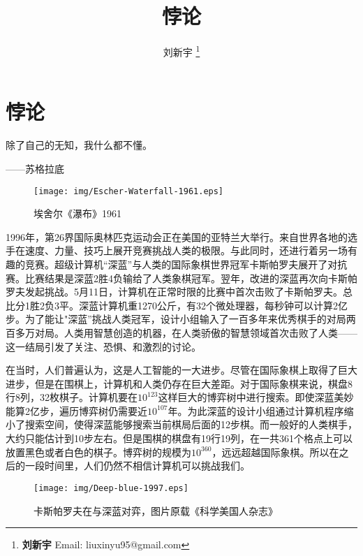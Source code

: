 \documentclass{article}
\begin{document}
\title{悖论}

\author{刘新宇
\thanks{{\bfseries 刘新宇} \newline
  Email: liuxinyu95@gmail.com \newline}
  }

\maketitle
\fi


\ifx\wholebook\relax
\chapter{悖论}
\fi

\epigraph{除了自己的无知，我什么都不懂。}{——苏格拉底}

\begin{wrapfigure}{R}{0.5\textwidth}
 \centering
 \texttt{[image: img/Escher-Waterfall-1961.eps]}
 \captionsetup{labelformat=empty}
 \caption{埃舍尔《瀑布》1961}
 \label{fig:Escher-Waterfall}
\end{wrapfigure}

1996年，第26界国际奥林匹克运动会正在美国的亚特兰大举行。来自世界各地的选手在速度、力量、技巧上展开竞赛挑战人类的极限。与此同时，还进行着另一场有趣的竞赛。超级计算机“深蓝”与人类的国际象棋世界冠军卡斯帕罗夫展开了对抗赛。比赛结果是深蓝2胜4负输给了人类象棋冠军。翌年，改进的深蓝再次向卡斯帕罗夫发起挑战。5月11日，计算机在正常时限的比赛中首次击败了卡斯帕罗夫。总比分1胜2负3平。深蓝计算机重1270公斤，有32个微处理器，每秒钟可以计算2亿步。为了能让"深蓝”挑战人类冠军，设计小组输入了一百多年来优秀棋手的对局两百多万对局。人类用智慧创造的机器，在人类骄傲的智慧领域首次击败了人类——这一结局引发了关注、恐惧、和激烈的讨论。

在当时，人们普遍认为，这是人工智能的一大进步。尽管在国际象棋上取得了巨大进步，但是在围棋上，计算机和人类仍存在巨大差距。对于国际象棋来说，棋盘8行8列，32枚棋子。计算机要在$10^{123}$这样巨大的博弈树中进行搜索。即使深蓝美妙能算2亿步，遍历博弈树仍需要近$10^{107}$年。为此深蓝的设计小组通过计算机程序缩小了搜索空间，使得深蓝能够搜索当前棋局后面的12步棋。而一般好的人类棋手，大约只能估计到10步左右。但是围棋的棋盘有19行19列，在一共361个格点上可以放置黑色或者白色的棋子。博弈树的规模为$10^{360}$，远远超越国际象棋。所以在之后的一段时间里，人们仍然不相信计算机可以挑战我们。

\begin{figure}[htbp]
 \centering
 \texttt{[image: img/Deep-blue-1997.eps]}
 \captionsetup{labelformat=empty}
 \caption{卡斯帕罗夫在与深蓝对弈，图片原载《科学美国人杂志》}
 \label{fig:Deep-blue-1997}
\end{figure}
\end{document}
